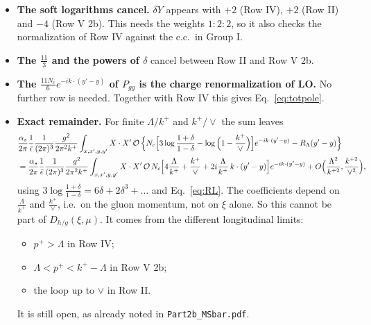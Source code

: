 \documentclass[10pt]{article}
\numberwithin{equation}{section}
\newcommand{\OO}{\mathcal O}
\newcommand{\pre}{\frac{1}{(2\pi)^3}\frac{g^2}{2\pi^2k^+}}
\begin{document}
\begin{itemize}
\item \textbf{The soft logarithms cancel.} $\delta Y$ appears with $+2$ (Row IV), $+2$ (Row II) and $-4$ (Row V 2b). This needs the weights $1:2:2$, so it also checks the normalization of Row IV against the c.c.\ in Group I.
\item \textbf{The $\frac{11}{3}$ and the powers of $\delta$} cancel between Row II and Row V 2b.
\item \textbf{The $\frac{11N_c}{6}e^{-ik\cdot(y'-y)}$ of $P_{gg}$ is the charge renormalization of LO.} No further row is needed. Together with Row IV this gives Eq.~\eqref{eq:totpole}.
\item \textbf{Exact remainder.} For finite $\Lambda/k^+$ and $k^+/\vee$ the sum leaves
\begin{align}
&\frac{\alpha_s}{2\pi}\frac{1}{\bar\epsilon}\pre\int_{x,x',y,y'}X\cdot X'\,\OO\,\Big\{N_c\Big[3\log\frac{1+\delta}{1-\delta}-\log\Big(1-\frac{k^+}{\vee}\Big)\Big]e^{-ik\cdot(y'-y)}-R_\Lambda(y'-y)\Big\}\notag\\
&=\frac{\alpha_s}{2\pi}\frac{1}{\bar\epsilon}\pre\int_{x,x',y,y'}X\cdot X'\,\OO\,N_c\Big[4\frac{\Lambda}{k^+}+\frac{k^+}{\vee}+2i\frac{\Lambda}{k^+}\,k\cdot(y'-y)\Big]e^{-ik\cdot(y'-y)}+O\Big(\frac{\Lambda^2}{k^{+2}},\frac{k^{+2}}{\vee^2}\Big),
\end{align}
using $3\log\frac{1+\delta}{1-\delta}=6\delta+2\delta^3+\dots$ and Eq.~\eqref{eq:RL}. The coefficients depend on $\frac{\Lambda}{k^+}$ and $\frac{k^+}{\vee}$, i.e.\ on the gluon momentum, not on $\xi$ alone. So this cannot be part of $D_{h/g}(\xi,\mu)$. It comes from the different longitudinal limits:
\begin{itemize}
\item $p^+>\Lambda$ in Row IV;
\item $\Lambda<p^+<k^+-\Lambda$ in Row V 2b;
\item the loop up to $\vee$ in Row II.
\end{itemize}
It is still open, as already noted in \texttt{Part2b\_MSbar.pdf}.
\end{itemize}

\end{document}
